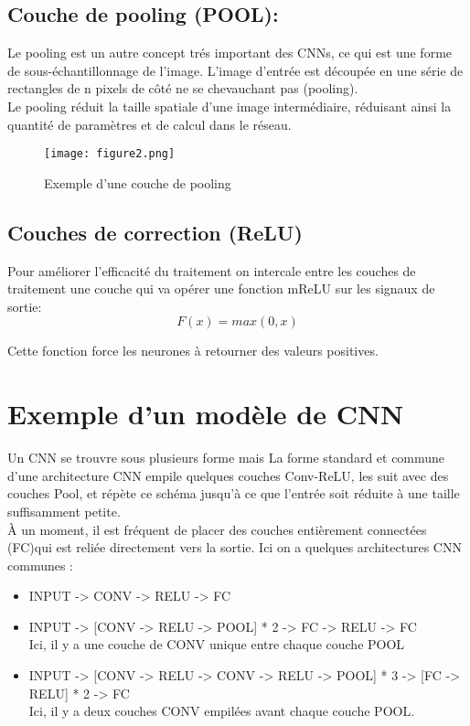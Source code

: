 \documentclass[a4paper,11pt]{report}
\begin{document}
\subsection {Couche de pooling (POOL):}
 Le pooling est un autre concept trés important des CNNs, ce qui est une forme de sous-échantillonnage de
l'image. L'image d'entrée est découpée en une série de rectangles de n pixels de côté ne se chevauchant
pas (pooling). \\

Le pooling réduit la taille spatiale d'une image intermédiaire, réduisant ainsi la quantité de paramètres et de calcul dans le réseau.
\begin{figure}[!htbp]
\begin{center}
\texttt{[image: figure2.png]}
\caption{Exemple d’une couche de pooling}
\end{center}
\end{figure}
\newpage

\subsection {Couches de correction (ReLU)}

Pour améliorer l'efficacité du traitement on intercale entre les couches de traitement une
couche qui va opérer une fonction mReLU sur les signaux de sortie: 
\begin{equation}
F(x)=max(0,x) 
\end{equation}

Cette fonction force les
neurones à retourner des valeurs positives.


\section{Exemple d'un modèle de CNN}
Un CNN se trouvre sous plusieurs forme mais La forme standard et commune d'une architecture CNN empile quelques couches Conv-ReLU, les suit avec
des couches Pool, et répète ce schéma jusqu'à ce que l'entrée soit réduite à une taille suffisamment petite.\\
À un moment, il est fréquent de placer des couches entièrement connectées (FC)qui est reliée directement vers la sortie. Ici on a quelques architectures CNN communes :
\begin{itemize}
\item [\star] INPUT -> CONV -> RELU -> FC
\item [\star] INPUT -> [CONV -> RELU -> POOL] * 2 -> FC -> RELU -> FC\\
Ici, il y a une couche de CONV unique entre chaque couche POOL 
\item [\star] INPUT -> [CONV -> RELU -> CONV -> RELU -> POOL] * 3 -> [FC -> RELU] * 2 -> FC \\
Ici, il y a
deux couches CONV empilées avant chaque couche POOL.
\end{itemize}
\end{document}
